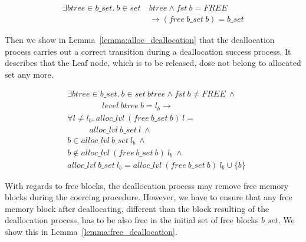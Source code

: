 \begin{lemma} 
\label{lemma:deallocate_fail2}
\begin{align*}
\exists btree \in b\_set.\ b \in set\ &btree \wedge fst\ b = FREE\\
&\longrightarrow (free\ b\_set\ b) = b\_set
\end{align*}
\end{lemma}

Then we show in Lemma~\ref{lemma:alloc_deallocation} that the deallocation process carries out a correct transition during a deallocation success process. It describes that the Leaf node, which is to be released, dose not belong to allocated set any more.

\begin{lemma} 
\label{lemma:alloc_deallocation}
\end{lemma}
\vspace{-7pt}
\begin{align*}
&\exists btree \in b\_set.\ b \in set\ btree \wedge fst\ b \neq FREE\ \wedge\\
&\ \ \ \ \ \ \ \ \ \ \ \ \ \ \ \ \ \ \ level\ btree\ b = l_b \longrightarrow\\
&\forall l \ne l_b.\ alloc\_lvl\ (free\ b\_set\ b)\ l =\\
&\ \ \ \ \ \ \ \ \ \ \ \ alloc\_lvl\ b\_set\ l\ \wedge\\
&b \in alloc \_lvl\ b\_set\ l_b\ \wedge\\
&b \notin alloc\_lvl\ (free\ b\_set\ b)\ l_b\ \wedge\\
&alloc\_lvl\ b\_set\ l_b = alloc\_lvl\ (free\ b\_set\ b)\ l_b \cup \lbrace b \rbrace
\end{align*}
\vspace{-12pt}

With regards to free blocks, the deallocation process may remove free memory blocks during the coercing procedure. However, we have to ensure that any free memory block after deallocating, different than the block resulting of the deallocation process, has to be also free in the initial set of free blocks $b\_set$. We show this in Lemma~\ref{lemma:free_deallocation}.

